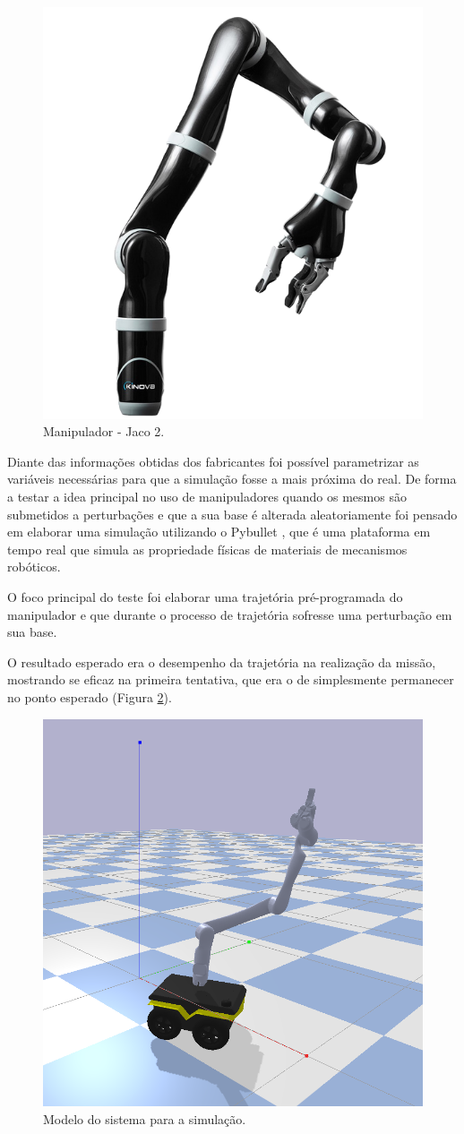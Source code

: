 \begin{figure}[H] 
  \begin{center} 
  	\includegraphics[width=0.4 \textwidth]{images/jaco2.png} 
  \end{center} 
  \caption{Manipulador - Jaco 2.} 
  \label{fig:jaco2} 
\end{figure}

Diante das informações obtidas dos fabricantes foi possível parametrizar as variáveis necessárias para que a simulação fosse a mais próxima do real. De forma a testar a idea principal no uso de manipuladores quando os mesmos são submetidos a perturbações e que a sua base é alterada aleatoriamente foi pensado em elaborar uma simulação utilizando o Pybullet \cite{pybullet} , que é uma plataforma em tempo real que simula as propriedade físicas de materiais de mecanismos robóticos.

O foco principal do teste foi elaborar uma trajetória pré-programada do manipulador e que durante o processo de trajetória sofresse uma perturbação em sua base.

O resultado esperado era o desempenho da trajetória na realização da missão, mostrando se eficaz na primeira tentativa, que era o de simplesmente permanecer no ponto esperado (Figura \ref{fig:jjsim}).
\begin{figure}[H] 
  \begin{center} 
  	\includegraphics[width=0.4 \textwidth]{images/jjsim.png} 
  \end{center} 
  \caption{Modelo do sistema para a simulação.} 
  \label{fig:jjsim} 
\end{figure}

